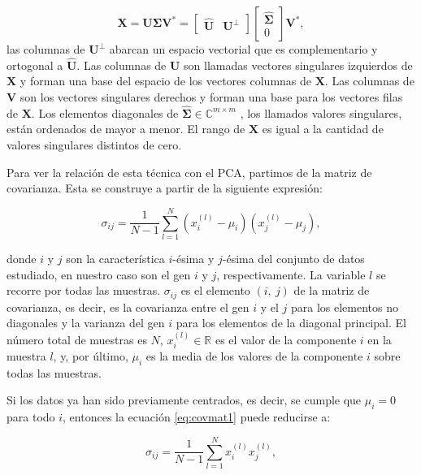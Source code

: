 \begin{equation}
	\mathbf{X} = \mathbf{U} \mathbf{\Sigma} \mathbf{V}^* = \begin{bmatrix} 	\hat{\mathbf{U}} & \mathbf{U}^\perp \end{bmatrix} \begin{bmatrix} \hat{\mathbf{\Sigma}} \\ 0 \end{bmatrix} \mathbf{V}^*,
\end{equation}
las columnas de $\mathbf{U}^\perp$ abarcan un espacio vectorial que es complementario y ortogonal a $\hat{\mathbf{U}}$. Las columnas de $\mathbf{U}$ son llamadas vectores singulares izquierdos de $\mathbf{X}$ y forman una base del espacio de los vectores columnas de $\mathbf{X}$. Las columnas de $\mathbf{V}$ son los vectores singulares derechos y forman una base para los vectores filas de $\mathbf{X}$. Los elementos diagonales de $\hat{\mathbf{\Sigma}} \in \mathbb{C}^{m \times m}$ , los llamados valores singulares, están ordenados de mayor a menor. El rango de $\mathbf{X}$ es igual a la cantidad de valores singulares distintos de cero.

Para ver la relación de esta técnica con el PCA, partimos de la matriz de covarianza. Esta se construye a partir de la siguiente expresión:

\begin{equation}
	\sigma_{ij} = \frac{1}{N - 1}\displaystyle{\sum_{l=1}^{N} \left( x_i^{(l)} - \mu_i \right) \left( x_j^{(l)} - \mu_j \right)},
	\label{eq:covmat1}
\end{equation}

donde $i$ y $j$ son la característica $i$-ésima y $j$-ésima del conjunto de datos estudiado, en nuestro caso son el gen $i$ y $j$, respectivamente. La variable $l$ se recorre por todas las muestras. $\sigma_{ij}$ es el elemento $(i,\ j)$ de la matriz de covarianza, es decir, es la covarianza entre el gen $i$ y el $j$ para los elementos no diagonales y la varianza del gen $i$ para los elementos de la diagonal principal. El número total de muestras es $N$, $x_i^{(l)} \in \mathbb{R}$ es el valor de la componente $i$ en la muestra $l$, y, por último, $\mu_i$ es la media de los valores de la componente $i$ sobre todas las muestras.

Si los datos ya han sido previamente centrados, es decir, se cumple que $\mu_i = 0$ para todo $i$, entonces la ecuación \eqref{eq:covmat1} puede reducirse a:

\begin{equation}
	\sigma_{ij} = \frac{1}{N - 1} \displaystyle{ \sum_{l=1}^{N} x_i^{(l)} x_j^{(l)} },
	\label{eq:covmat2}
\end{equation}

